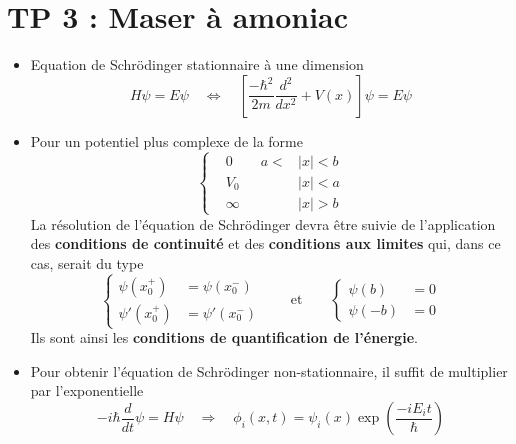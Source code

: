 \section*{TP 3 : Maser à amoniac}
\begin{itemize}
	\item Equation de Schrödinger stationnaire à une dimension 
	      \begin{equation}
	      	H\psi = E\psi \quad \Leftrightarrow \quad \left[\frac{-\hbar ^2}{2m}\frac{d^2}{dx^2} + V(x)\right]\psi = E \psi
	      \end{equation}
	\item Pour un potentiel plus complexe de la forme 
	      \begin{equation}
	      	\left\{ 
	      	\begin{aligned}
	      		  & 0 \qquad a<   & |x| <b \\
	      		  & V_0 \qquad    & |x|<a  \\
	      		  & \infty \qquad & |x|>b  
	      	\end{aligned}
	      	\right.
	      \end{equation}
	      La résolution de l'équation de Schrödinger devra être suivie de l'application des \textbf{conditions de continuité} et des \textbf{conditions aux limites} qui, dans ce cas, serait du type
	      \begin{equation}
	      	\left\{ 
	      	\begin{aligned}
	      		\psi (x_0^+)  & = \psi (x_0^-)  \\
	      		\psi '(x_0^+) & = \psi '(x_0^-) 
	      	\end{aligned}
	      	\right.
	      	\qquad
	      	\mbox{et}
	      	\qquad 
	      	\left\{ 
	      	\begin{aligned}
	      		\psi (b)  & = 0 \\
	      		\psi (-b) & = 0 
	      	\end{aligned}
	      	\right.
	      \end{equation}
	      Ils sont ainsi les \textbf{conditions de quantification de l'énergie}.
	      		
	\item Pour obtenir l'équation de Schrödinger non-stationnaire, il suffit de multiplier par l'exponentielle
	      \begin{equation}
	      	-i\hbar \frac{d}{dt}\psi = H \psi \quad \Rightarrow \quad \phi _i(x,t) = \psi _i (x) \exp \left( \frac{-iE_i t}{\hbar}\right) 
	      \end{equation}
\end{itemize}

